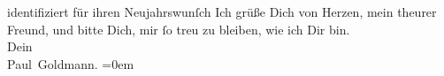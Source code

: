 \begin{ledgroupsized}[t]{13cm}
{{{                  identifiziert}}}\label{K_L02605-1h} für ihren Neujahrswunſch\pend
           \pstart
           Ich grüße Dich von Herzen, mein theurer Freund, und bitte Dich, mir ſo treu zu
               bleiben, wie ich Dir bin. {\\[\baselineskip]}Dein {\\[\baselineskip]}\spacefill\mbox{Paul Goldmann.}\pend
           \leftskip=0em{}          \endnumbering{}\end{ledgroupsized}  \newcommand{\dateiname}{L02605}\newcommand{\titel}{Paul Goldmann an Arthur Schnitzler, 8. 1. [1894]}\newcommand{\editorInnen}{Martin Anton Müller und Laura Untner}
            \footnotesize
\begin{ledgroupsized}[t]{11.5cm}
\end{ledgroupsized}
         
      